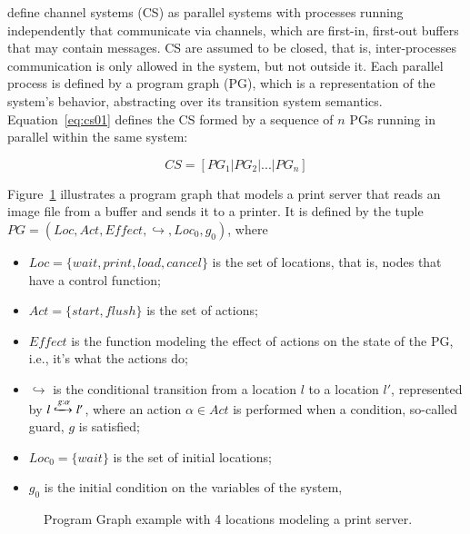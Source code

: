 \citet{MC01} define channel systems (CS) as parallel systems with processes running independently that communicate via channels, which are first-in, first-out buffers that may contain messages. CS are assumed to be closed, that is, inter-processes communication is only allowed in the system, but not outside it. Each parallel process is defined by a program graph (PG), which is a representation of the system's behavior, abstracting over its transition system semantics. Equation~\ref{eq:cs01} defines the CS formed by a sequence of $n$ PGs running in parallel within the same system:


\begin{equation}
    \label{eq:cs01}
    CS=[PG_1|PG_2|...|PG_n]
\end{equation}

Figure~\ref{fig:pg_example} illustrates a program graph that models a print server that reads an image file from a buffer and sends it to a printer. It is defined by the tuple\\ $\mathit{PG=(Loc,Act,Effect,\hookrightarrow,Loc_0,g_0)}$, where



\begin{itemize}
    \item $Loc=\{wait, print, load, cancel\}$ is the set of locations, that is,     nodes that have a control function;
    \item $Act=\{start, flush\}$ is the set of actions;
    \item $\mathit{Effect}$ is the function modeling the effect of actions on the state of the PG, i.e., it's what the actions do;
    \item $\hookrightarrow$ is the conditional transition from a location $l$ to a location $l'$, represented by $l\xhookrightarrow[]{g:\alpha}l'$, where an action $\alpha \in Act$ is performed when a condition, so-called guard, $g$ is satisfied;
    \item $Loc_0=\{wait\}$ is the set of initial locations;
    \item $g_0$ is the initial condition on the variables of the system, 
\end{itemize}

\begin{figure}[!ht]
    \centering
    \color{black}
    \scalebox{.8}{}
    \caption{Program Graph example with 4 locations modeling a print server.}
    \label{fig:pg_example}
\end{figure}

